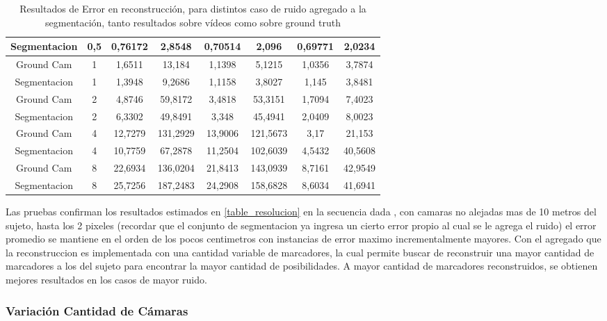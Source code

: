 \begin{table}[h]
\begin{tabular}{cc|c|c|c|c|c|c|}
\multicolumn{1}{|c|}{Segmentacion} & 0,5 & 0,76172 & 2,8548 & 0,70514 & 2,096 & 0,69771 & 2,0234 \\ \hline
\multicolumn{1}{|c|}{Ground Cam} & 1 & 1,6511 & 13,184 & 1,1398 & 5,1215 & 1,0356 & 3,7874 \\ \hline
\multicolumn{1}{|c|}{Segmentacion} & 1 & 1,3948 & 9,2686 & 1,1158 & 3,8027 & 1,145 & 3,8481 \\ \hline
\multicolumn{1}{|c|}{Ground Cam} & 2 & 4,8746 & 59,8172 & 3,4818 & 53,3151 & 1,7094 & 7,4023 \\ \hline
\multicolumn{1}{|c|}{Segmentacion} & 2 & 6,3302 & 49,8491 & 3,348 & 45,4941 & 2,0409 & 8,0023 \\ \hline
\multicolumn{1}{|c|}{Ground Cam} & 4 & 12,7279 & 131,2929 & 13,9006 & 121,5673 & 3,17 & 21,153 \\ \hline
\multicolumn{1}{|c|}{Segmentacion} & 4 & 10,7759 & 67,2878 & 11,2504 & 102,6039 & 4,5432 & 40,5608 \\ \hline
\multicolumn{1}{|c|}{Ground Cam} & 8 & 22,6934 & 136,0204 & 21,8413 & 143,0939 & 8,7161 & 42,9549 \\ \hline
\multicolumn{1}{|c|}{Segmentacion} & 8 & 25,7256 & 187,2483 & 24,2908 & 158,6828 & 8,6034 & 41,6941 \\ \hline
\end{tabular}
\caption{Resultados de Error en reconstrucción, para distintos caso de ruido agregado a la segmentación, tanto resultados sobre vídeos como sobre ground truth}
\end{table}

Las pruebas confirman los resultados estimados en \ref{table_resolucion} en la secuencia dada , con camaras no alejadas mas de 10 metros del sujeto, hasta los 2 pixeles (recordar que el conjunto de segmentacion ya ingresa un cierto error propio al cual se le agrega el ruido) el error promedio se mantiene en el orden de los pocos centimetros con instancias de error maximo incrementalmente mayores. Con el agregado que la reconstruccion es implementada con una cantidad variable de marcadores, la cual permite buscar de reconstruir una mayor cantidad de marcadores a los del sujeto para encontrar la mayor cantidad de posibilidades. A mayor cantidad de marcadores reconstruidos, se obtienen mejores resultados en los casos de mayor ruido.

\subsubsection{Variación Cantidad de Cámaras}

